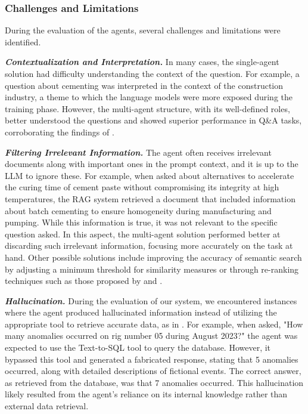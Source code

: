             
            \subsubsection{Challenges and Limitations}     
                During the evaluation of the agents, several challenges and limitations were identified.

                \textbf{\textit{Contextualization and Interpretation.}} 
                    In many cases, the single-agent solution had difficulty understanding the context of the question. For example, a question about cementing was interpreted in the context of the construction industry, a theme to which the language models were more exposed during the training phase. 
                    However, the multi-agent structure, with its well-defined roles, better understood the questions and showed superior performance in Q\&A tasks, corroborating the findings of \citep{Li2024}.
                
                \textbf{\textit{Filtering Irrelevant Information.}} 
                    The agent often receives irrelevant documents along with important ones in the prompt context, and it is up to the LLM to ignore these. 
                    For example, when asked about alternatives to accelerate the curing time of cement paste without compromising its integrity at high temperatures, the RAG system retrieved a document that included information about batch cementing to ensure homogeneity during manufacturing and pumping. 
                    While this information is true, it was not relevant to the specific question asked. 
                    In this aspect, the multi-agent solution performed better at discarding such irrelevant information, focusing more accurately on the task at hand. 
                    Other possible solutions include improving the accuracy of semantic search by adjusting a minimum threshold for similarity measures or through re-ranking techniques such as those proposed by \citep{Carraro2024} and \citep{Sun2023}.
                
                \textbf{\textit{Hallucination.}} 
                    During the evaluation of our system, we encountered instances where the agent produced hallucinated information instead of utilizing the appropriate tool to retrieve accurate data, as in \citep{Bilbao2023}. 
                    For example, when asked, "How many anomalies occurred on rig number 05 during August 2023?" the agent was expected to use the Text-to-SQL tool to query the database. 
                    However, it bypassed this tool and generated a fabricated response, stating that 5 anomalies occurred, along with detailed descriptions of fictional events. The correct answer, as retrieved from the database, was that 7 anomalies occurred. This hallucination likely resulted from the agent's reliance on its internal knowledge rather than external data retrieval. 

